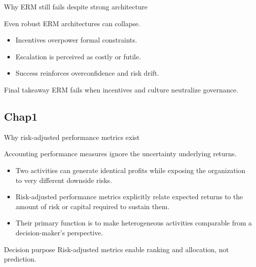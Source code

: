 \documentclass[aspectratio=169, 10pt]{beamer} %
\begin{document}
\begin{frame}{Why ERM still fails despite strong architecture}

Even robust ERM architectures can collapse.

\medskip

\begin{itemize}
  \item[$\bullet$] Incentives overpower formal constraints.
  \item[$\bullet$] Escalation is perceived as costly or futile.
  \item[$\bullet$] Success reinforces overconfidence and risk drift.
\end{itemize}

\begin{block}{Final takeaway}
ERM fails when incentives and culture neutralize governance.
\end{block}
\medskip 

 \href{https://github.com/fsananou/bsb-erm/blob/main/_exercice_and_cases.pdf}{}
\end{frame}

\subsection{Chap1}
\begin{frame}{}

\centering
\color{blue} 

\end{frame}

\begin{frame}{Why risk-adjusted performance metrics exist}

Accounting performance measures ignore the uncertainty underlying returns.

\medskip

\begin{itemize}
  \item[$\bullet$] Two activities can generate identical profits while exposing
  the organization to very different downside risks.

  \item[$\bullet$] Risk-adjusted performance metrics explicitly relate expected
  returns to the amount of risk or capital required to sustain them.

  \item[$\bullet$] Their primary function is to make heterogeneous activities
  comparable from a decision-maker’s perspective.
\end{itemize}

\begin{block}{Decision purpose}
Risk-adjusted metrics enable ranking and allocation, not prediction.
\end{block}

\end{frame}
\end{document}
